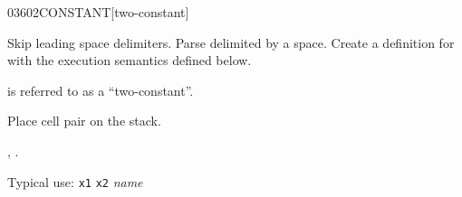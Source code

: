 \begin{worddef}{0360}{2CONSTANT}[two-constant]
\item {}

	Skip leading space delimiters. Parse  delimited by
	a space. Create a definition for  with the execution
	semantics defined below.

	 is referred to as a ``two-constant''.

\execute[name]

	Place cell pair  on the stack.

\see {},
	.


	\begin{rationale} %
		Typical use:
			\texttt{x1} \texttt{x2}  \emph{name}
	\end{rationale}

	\begin{testing}
		 \\

		 \\

		 \\
		 \\

		 \\
	\end{testing}
\end{worddef}


